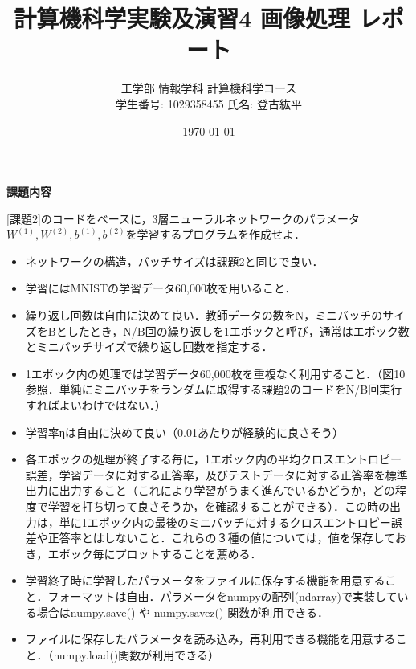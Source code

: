 \documentclass[11px,a4,dvipdfmx]{jsarticle}
\begin{document}
\title{計算機科学実験及演習4 画像処理 レポート}
\author{工学部 情報学科 計算機科学コース\\学生番号: 1029358455 \hspace{1em} 氏名: 登古紘平}
\date{\today}
\maketitle
\newpage

\begin{center}
\textbf{課題内容}
\end{center}
[課題2]のコードをベースに，3層ニューラルネットワークのパラメータ$W^{(1)},W^{(2)},b^{(1)},b^{(2)}$を学習するプログラムを作成せよ．
\begin{itemize}
\item ネットワークの構造，バッチサイズは課題2と同じで良い．
\item 学習にはMNISTの学習データ60,000枚を用いること．
\item 繰り返し回数は自由に決めて良い．教師データの数をN，ミニバッチのサイズをBとしたとき，N/B回の繰り返しを1エポックと呼び，通常はエポック数とミニバッチサイズで繰り返し回数を指定する．
\item 1エポック内の処理では学習データ60,000枚を重複なく利用すること．（図10参照．単純にミニバッチをランダムに取得する課題2のコードをN/B回実行すればよいわけではない．）
\item 学習率ηは自由に決めて良い（0.01あたりが経験的に良さそう）
\item 各エポックの処理が終了する毎に，1エポック内の平均クロスエントロピー誤差，学習データに対する正答率，及びテストデータに対する正答率を標準出力に出力すること（これにより学習がうまく進んでいるかどうか，どの程度で学習を打ち切って良さそうか，を確認することができる）．この時の出力は，単に1エポック内の最後のミニバッチに対するクロスエントロピー誤差や正答率とはしないこと．これらの３種の値については，値を保存しておき，エポック毎にプロットすることを薦める．
\item 学習終了時に学習したパラメータをファイルに保存する機能を用意すること．フォーマットは自由．パラメータをnumpyの配列(ndarray)で実装している場合はnumpy.save() や numpy.savez() 関数が利用できる．
\item ファイルに保存したパラメータを読み込み，再利用できる機能を用意すること．（numpy.load()関数が利用できる）\\
\end{itemize}
\end{document}
